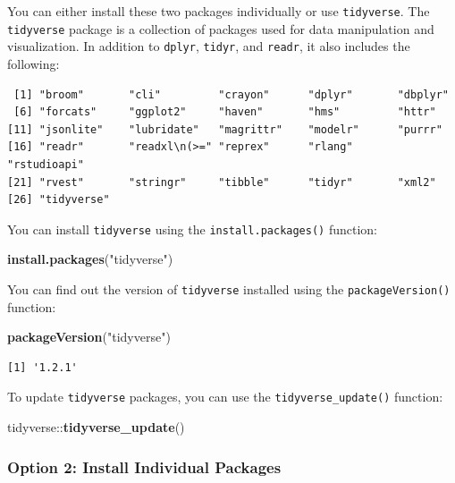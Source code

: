 \documentclass[]{article}
\newenvironment{Shaded}{\begin{snugshade}}{\end{snugshade}}
\newcommand{\KeywordTok}[1]{\textcolor[rgb]{0.13,0.29,0.53}{\textbf{{#1}}}}
\newcommand{\StringTok}[1]{\textcolor[rgb]{0.31,0.60,0.02}{{#1}}}
\newcommand{\NormalTok}[1]{{#1}}
\theoremstyle{definition}
\theoremstyle{definition}
\theoremstyle{definition}
\theoremstyle{remark}
\begin{document}
You can either install these two packages individually or use
\texttt{tidyverse}. The \texttt{tidyverse} package is a collection of
packages used for data manipulation and visualization. In addition to
\texttt{dplyr}, \texttt{tidyr}, and \texttt{readr}, it also includes the
following:

\begin{verbatim}
 [1] "broom"       "cli"         "crayon"      "dplyr"       "dbplyr"     
 [6] "forcats"     "ggplot2"     "haven"       "hms"         "httr"       
[11] "jsonlite"    "lubridate"   "magrittr"    "modelr"      "purrr"      
[16] "readr"       "readxl\n(>=" "reprex"      "rlang"       "rstudioapi" 
[21] "rvest"       "stringr"     "tibble"      "tidyr"       "xml2"       
[26] "tidyverse"  
\end{verbatim}

You can install \texttt{tidyverse} using the \texttt{install.packages()}
function:

\begin{Shaded}
\begin{Highlighting}[]
\KeywordTok{install.packages}\NormalTok{(}\StringTok{"tidyverse"}\NormalTok{)}
\end{Highlighting}
\end{Shaded}

You can find out the version of \texttt{tidyverse} installed using the
\texttt{packageVersion()} function:

\begin{Shaded}
\begin{Highlighting}[]
\KeywordTok{packageVersion}\NormalTok{(}\StringTok{"tidyverse"}\NormalTok{)}
\end{Highlighting}
\end{Shaded}

\begin{verbatim}
[1] '1.2.1'
\end{verbatim}

To update \texttt{tidyverse} packages, you can use the
\texttt{tidyverse\_update()} function:

\begin{Shaded}
\begin{Highlighting}[]
\NormalTok{tidyverse::}\KeywordTok{tidyverse_update}\NormalTok{()}
\end{Highlighting}
\end{Shaded}

\subsubsection{Option 2: Install Individual
Packages}\label{option-2-install-individual-packages}
\end{document}
